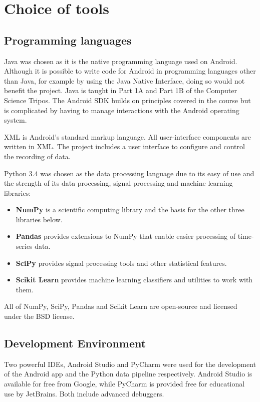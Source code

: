   \section{Choice of tools}
    \subsection{Programming languages}
      Java was chosen as it is the native programming language used on Android. Although it is
      possible to write code for Android in programming languages other than Java, for example 
      by using the Java Native Interface, doing so would not benefit the project. Java is taught in
      Part 1A and Part 1B of the Computer Science Tripos. The Android SDK builds on principles
      covered in the course but is complicated by having to manage interactions with the Android operating system.
      
      XML is Android's standard markup language. All user-interface components are written in XML.
      The project includes a user interface to configure and control the recording of data.
      
      Python 3.4 was chosen as the data processing language due to its easy of use and the strength of its data processing, signal processing and machine learning libraries:
      \begin{itemize}
        \item \textbf{NumPy} is a scientific computing library and the basis for the other three libraries below.
        \item \textbf{Pandas} provides extensions to NumPy that enable easier processing of time-series data.
        \item \textbf{SciPy} provides signal processing tools and other statistical features.
        \item \textbf{Scikit Learn} provides machine learning classifiers and utilities to work with them.
      \end{itemize}
      All of NumPy, SciPy, Pandas and Scikit Learn are open-source and licensed under the BSD license.
    \subsection{Development Environment}
      Two powerful IDEs, Android Studio and PyCharm were used for the development of the Android app and the Python data pipeline respectively. Android Studio is available for free from Google, while PyCharm is provided free for educational use by JetBrains. Both include advanced debuggers.
      
